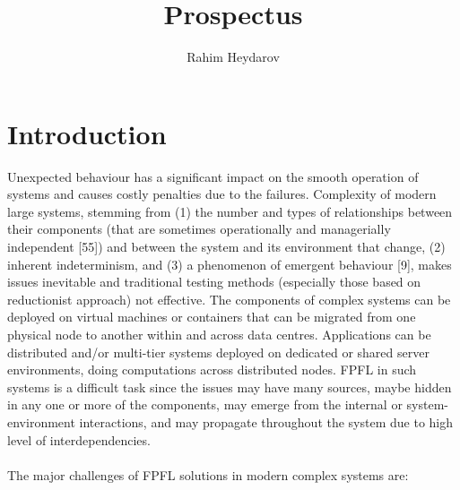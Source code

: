 \documentclass[]{usiinfprospectus}
\author{Rahim Heydarov}
\title{Prospectus}
\begin{document}
\maketitle
\section{Introduction}
Unexpected behaviour has a significant impact on the smooth operation of systems and causes costly penalties due to the failures.
Complexity of modern large systems, stemming from (1) the number and types of relationships between their components (that are sometimes operationally and managerially independent [55]) and between the system and its environment that change, (2) inherent indeterminism, and (3) a phenomenon of emergent behaviour [9], makes issues inevitable and traditional testing methods (especially those based on reductionist approach) not effective. The components of complex systems can be deployed on virtual machines or containers that can be migrated from one physical node to another within and across data centres. Applications can be distributed and/or multi-tier systems deployed on dedicated or shared server environments, doing computations across distributed nodes. FPFL in such systems is a difficult task since the issues may have many sources, maybe hidden in any one or more of the components, may emerge from the internal or system-environment interactions, and may propagate throughout the system due to high level of interdependencies.\\\\
%
The major challenges of FPFL solutions in modern complex systems are:
\end{document}

